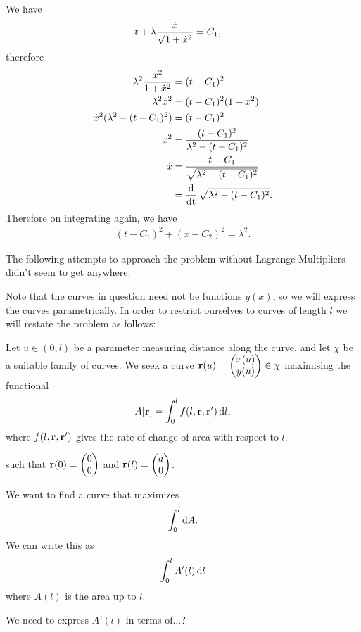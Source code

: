 We have
\begin{align*}
  t + \lambda \frac{\dot{x}}{\sqrt{1 + \dot{x}^2}} &= C_1,
\end{align*}
therefore
\begin{align*}
  \lambda^2 \frac{\dot{x}^2}{1 + \dot{x}^2} &= (t - C_1)^2 \\
  \lambda^2 \dot{x}^2 &= (t - C_1)^2(1 + \dot{x}^2) \\
  \dot{x}^2(\lambda^2 - (t - C_1)^2) &= (t - C_1)^2 \\
  \dot{x}^2 &= \frac{(t - C_1)^2}{\lambda^2 - (t - C_1)^2} \\
  \dot{x} &= \frac{t - C_1}{\sqrt{\lambda^2 - (t - C_1)^2}} \\
        &= \operatorname{\frac{\text{d}}{\text{dt}}} \sqrt{\lambda^2 - (t - C_1)^2}.
\end{align*}
Therefore on integrating again, we have
\begin{align*}
  (t - C_1)^2 + (x - C_2)^2 = \lambda^2.
\end{align*}

  The following attempts to approach the problem without Lagrange Multipliers didn't seem to get anywhere:

  Note that the curves in question need not be functions $y(x)$, so we will express the curves
  parametrically. In order to restrict ourselves to curves of length $l$ we will restate the problem
  as follows:

  Let $u \in (0, l)$ be a parameter measuring distance along the curve, and let $\chi$ be a suitable family of
  curves. We seek a curve $\mathbf{r}(u) = \begin{pmatrix}x(u)\\y(u)\end{pmatrix} \in \chi$ maximising the functional
\begin{align*}
  A[\r] = \int_0^l f(l, \r, \r') \d l,
\end{align*}
where $f(l, \mathbf{r}, \mathbf{r}')$ gives the rate of change of area with respect to $l$.

such that $\mathbf{r}(0) = \begin{pmatrix}0\\0\end{pmatrix}$ and $\mathbf{r}(l) = \begin{pmatrix}a\\0\end{pmatrix}$.

We want to find a curve that maximizes
\begin{align*}
  \int_0^l \d A.
\end{align*}
We can write this as
\begin{align*}
  \int_0^l A'(l) \d l
\end{align*}
where $A(l)$ is the area up to $l$.

We need to express $A'(l)$ in terms of...?
